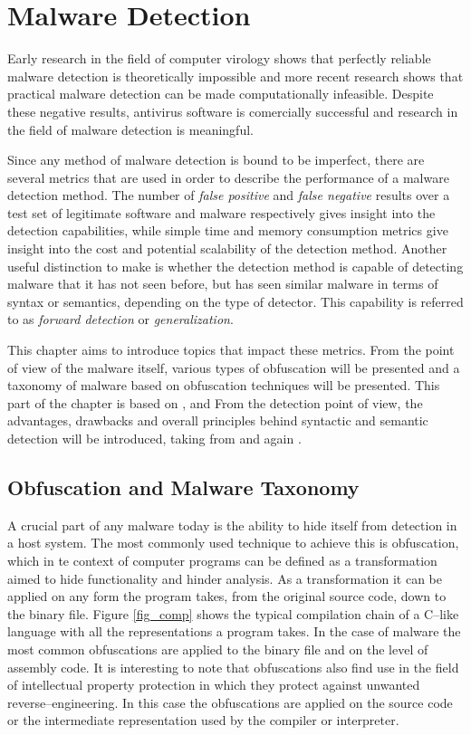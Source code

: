 \chapter{Malware Detection}
\label{ch_malware}
Early research in the field of computer virology shows that perfectly reliable malware detection is theoretically impossible\cite{Cohen86} and more recent research shows that practical malware detection can be made computationally infeasible\cite{Filiol12}. Despite these negative results, antivirus software is comercially successful and research in the field of malware detection is meaningful.

Since any method of malware detection is bound to be imperfect, there are several metrics that are used in order to describe the performance of a malware detection method. The number of \emph{false positive} and \emph{false negative} results over a test set of legitimate software and malware respectively gives insight into the detection capabilities, while simple time and memory consumption metrics give insight into the cost and potential scalability of the detection method. Another useful distinction to make is whether the detection method is capable of detecting malware that it has not seen before, but has seen similar malware in terms of syntax or semantics, depending on the type of detector. This capability is referred to as \emph{forward detection}\cite{Christo07} or \emph{generalization}\cite{Babic11}.

This chapter aims to introduce topics that impact these metrics. From the point of view of the malware itself, various types of obfuscation will be presented and a taxonomy of malware based on obfuscation techniques will be presented. This part of the chapter is based on \cite{You10}, \cite{Shiffman10} and \cite{Szor05} From the detection point of view, the advantages, drawbacks and overall principles behind syntactic and semantic detection will be introduced, taking from \cite{Jacob08} and again \cite{Szor05}.

\section{Obfuscation and Malware Taxonomy}
A crucial part of any malware today is the ability to hide itself from detection in a host system. The most commonly used technique to achieve this is obfuscation, which in te context of computer programs can be defined as a transformation aimed to hide functionality and hinder analysis. As a transformation it can be applied on any form the program takes, from the original source code, down to the binary file. Figure \ref{fig_comp} shows the typical compilation chain of a C--like language with all the representations a program takes. In the case of malware the most common obfuscations are applied to the binary file and on the level of assembly code. It is interesting to note that obfuscations also find use in the field of intellectual property protection in which they protect against unwanted reverse--engineering. In this case the obfuscations are applied on the source code or the intermediate representation used by the compiler or interpreter.

